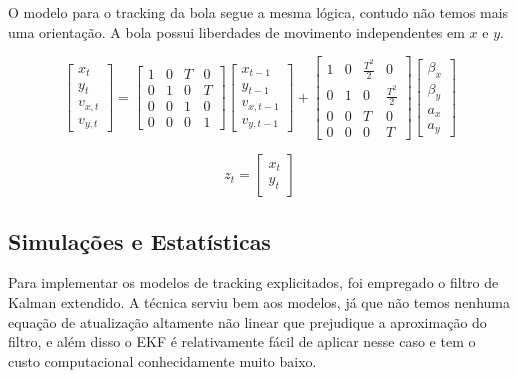 \documentclass[paper=a4, fontsize=11pt]{scrartcl}
\begin{document}
O modelo para o tracking da bola segue a mesma lógica, contudo não temos mais uma orientação. A bola possui liberdades de movimento independentes em $x$ e $y$.

\begin{equation}
    \begin{bmatrix} x_t \\ y_t \\ v_{x,t} \\ v_{y,t} \end{bmatrix}
    =
    \begin{bmatrix} 1 & 0 & T & 0 \\ 0 & 1 & 0 & T \\ 0 & 0 & 1 & 0 \\ 0 & 0 & 0 & 1 \end{bmatrix}
    \begin{bmatrix} x_{t-1} \\ y_{t-1} \\ v_{x,t-1} \\ v_{y,t-1} \end{bmatrix}
    +
    \begin{bmatrix} 1 & 0 & \frac{T^2}{2} & 0 \\ 0 & 1 & 0 & \frac{T^2}{2} \\ 0 & 0 & T & 0 \\ 0 & 0 & 0 & T \end{bmatrix}
    \begin{bmatrix} \beta_x \\ \beta_y \\ a_x \\ a_y \end{bmatrix}
\end{equation}

\begin{equation}
    z_t = \begin{bmatrix} x_t \\ y_t \end{bmatrix}
\end{equation}

\subsection{Simulações e Estatísticas}

Para implementar os modelos de tracking explicitados, foi empregado o filtro de Kalman extendido. A técnica serviu bem aos modelos, já que não temos nenhuma equação de atualização altamente não linear que prejudique a aproximação do filtro, e além disso o EKF é relativamente fácil de aplicar nesse caso e tem o custo computacional conhecidamente muito baixo.
\end{document}
